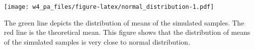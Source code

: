 \documentclass[]{article}
\begin{document}
\texttt{[image: w4\_pa\_files/figure-latex/normal\_distribution-1.pdf]}

The green line depicts the distribution of means of the simulated
samples. The red line is the theoretical mean. This figure shows that
the distribution of means of the simulated samples is very close to
normal distribution.
\end{document}

